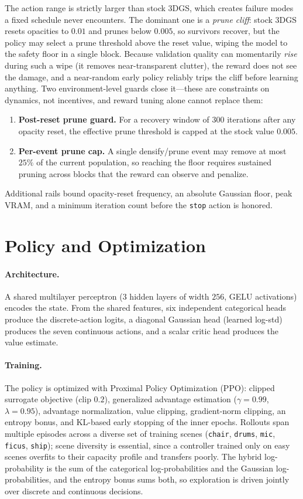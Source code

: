 \documentclass[11pt]{article}
\begin{document}
The action range is strictly larger than stock 3DGS, which creates failure modes a
fixed schedule never encounters. The dominant one is a \emph{prune cliff}: stock
3DGS resets opacities to $0.01$ and prunes below $0.005$, so survivors recover, but
the policy may select a prune threshold above the reset value, wiping the model to
the safety floor in a single block. Because validation quality can momentarily
\emph{rise} during such a wipe (it removes near-transparent clutter), the reward
does not see the damage, and a near-random early policy reliably trips the cliff
before learning anything. Two environment-level guards close it---these are
constraints on dynamics, not incentives, and reward tuning alone cannot replace
them:
\begin{enumerate}[leftmargin=1.5em]
  \item \textbf{Post-reset prune guard.} For a recovery window of $300$ iterations
  after any opacity reset, the effective prune threshold is capped at the stock
  value $0.005$.
  \item \textbf{Per-event prune cap.} A single densify/prune event may remove at
  most $25\%$ of the current population, so reaching the floor requires sustained
  pruning across blocks that the reward can observe and penalize.
\end{enumerate}
Additional rails bound opacity-reset frequency, an absolute Gaussian floor, peak
VRAM, and a minimum iteration count before the \texttt{stop} action is honored.

\section{Policy and Optimization}

\paragraph{Architecture.}
A shared multilayer perceptron (3 hidden layers of width $256$, GELU activations)
encodes the state. From the shared features, six independent categorical heads
produce the discrete-action logits, a diagonal Gaussian head (learned log-std)
produces the seven continuous actions, and a scalar critic head produces the
value estimate.

\paragraph{Training.}
The policy is optimized with Proximal Policy Optimization (PPO): clipped surrogate
objective (clip $0.2$), generalized advantage estimation ($\gamma=0.99$,
$\lambda=0.95$), advantage normalization, value clipping, gradient-norm clipping,
an entropy bonus, and KL-based early stopping of the inner epochs. Rollouts span
multiple episodes across a diverse set of training scenes
(\texttt{chair}, \texttt{drums}, \texttt{mic}, \texttt{ficus}, \texttt{ship});
scene diversity is essential, since a controller trained only on easy scenes
overfits to their capacity profile and transfers poorly. The hybrid log-probability
is the sum of the categorical log-probabilities and the Gaussian
log-probabilities, and the entropy bonus sums both, so exploration is driven
jointly over discrete and continuous decisions.
\end{document}
